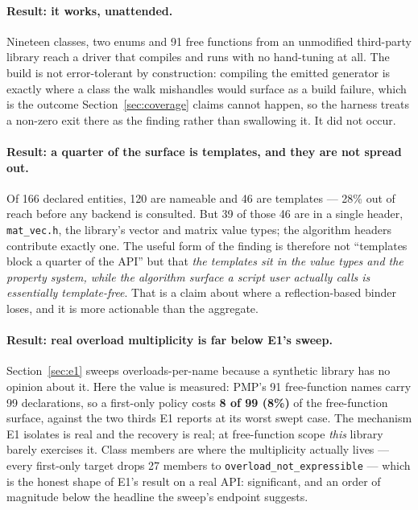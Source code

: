 \documentclass[11pt,a4paper]{article}
\newcommand{\code}[1]{\texttt{\small #1}}
\begin{document}
\paragraph{Result: it works, unattended.} Nineteen classes, two enums and 91
free functions from an unmodified third-party library reach a driver that
compiles and runs with no hand-tuning at all. The build is not error-tolerant by
construction: compiling the emitted generator is exactly where a class the walk
mishandles would surface as a build failure, which is the outcome
Section~\ref{sec:coverage} claims cannot happen, so the harness treats a
non-zero exit there as the finding rather than swallowing it. It did not occur.

\paragraph{Result: a quarter of the surface is templates, and they are not
spread out.} Of 166 declared entities, 120 are nameable and 46 are templates ---
28\% out of reach before any backend is consulted. But 39 of those 46 are in a
single header, \code{mat\_vec.h}, the library's vector and matrix value types;
the algorithm headers contribute exactly one. The useful form of the finding is
therefore not ``templates block a quarter of the API'' but that
\emph{the templates sit in the value types and the property system, while the
algorithm surface a script user actually calls is essentially template-free}.
That is a claim about where a reflection-based binder loses, and it is more
actionable than the aggregate.

\paragraph{Result: real overload multiplicity is far below E1's sweep.}
Section~\ref{sec:e1} sweeps overloads-per-name because a synthetic library has
no opinion about it. Here the value is measured: PMP's 91 free-function names
carry 99 declarations, so a first-only policy costs \textbf{8 of 99 (8\%)} of the
free-function surface, against the two thirds E1 reports at its worst swept
case. The mechanism E1 isolates is real and the recovery is real; at
free-function scope \emph{this} library barely exercises it. Class members are
where the multiplicity actually lives --- every first-only target drops 27
members to \code{overload\_not\_expressible} --- which is the honest shape of
E1's result on a real API: significant, and an order of magnitude below the
headline the sweep's endpoint suggests.
\end{document}
